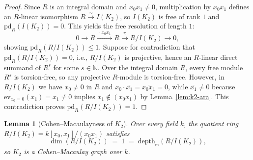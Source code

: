\documentclass[11pt,a4paper]{amsart}
\theoremstyle{plain}
\newtheorem{lemma}[theorem]{Lemma}
\theoremstyle{definition}
\newcommand{\pd}{\mathrm{pd}}
\newcommand{\depth}{\mathrm{depth}}
\newcommand{\mm}{\mathfrak{m}}
\begin{document}
\begin{proof}
Since $R$ is an integral domain and $x_0 x_1 \neq 0$, multiplication by $x_0 x_1$ defines an $R$-linear isomorphism $R \xrightarrow{\sim} I(K_2)$, so $I(K_2)$ is free of rank $1$ and $\pd_R(I(K_2)) = 0$. This yields the free resolution of length $1$:
\[
  0 \longrightarrow R \xrightarrow{\;\cdot x_0 x_1\;} R \xrightarrow{\;\pi\;} R/I(K_2) \longrightarrow 0,
\]
showing $\pd_R(R/I(K_2)) \le 1$. Suppose for contradiction that $\pd_R(R/I(K_2)) = 0$, i.e., $R/I(K_2)$ is projective, hence an $R$-linear direct summand of $R^s$ for some $s \in \mathbb{N}$. Over the integral domain $R$, every free module $R^s$ is torsion-free, so any projective $R$-module is torsion-free. However, in $R/I(K_2)$ we have $x_0 \neq 0$ in $R$ and $x_0 \cdot \overline{x_1} = \overline{x_0 x_1} = 0$, while $\overline{x_1} \neq 0$ because $\mathrm{ev}_{x_0=0}(x_1) = x_1 \neq 0$ implies $x_1 \notin (x_0 x_1)$ by Lemma~\ref{lem:k2-ara}. This contradiction proves $\pd_R(R/I(K_2)) = 1$.
\end{proof}

\begin{lemma}[Cohen--Macaulayness of $K_2$]\label{lem:k2-cm}
Over every field $k$, the quotient ring $R/I(K_2) = k[x_0, x_1]/(x_0 x_1)$ satisfies
\[
  \dim(R/I(K_2)) \;=\; 1 \;=\; \depth_{\mm}(R/I(K_2)),
\]
so $K_2$ is a Cohen--Macaulay graph over $k$.
\end{lemma}
\end{document}
